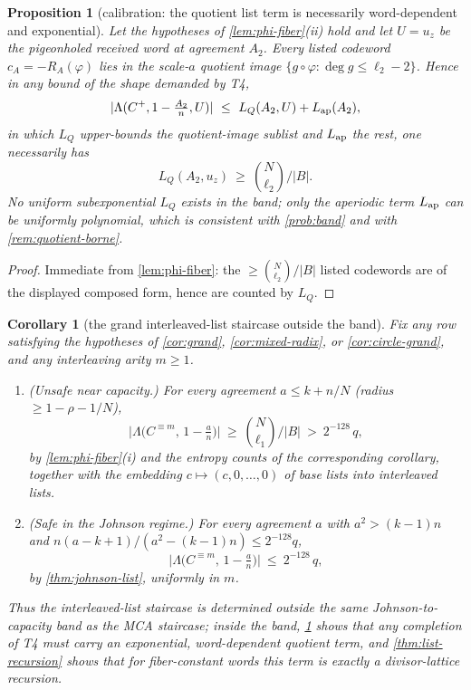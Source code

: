 \documentclass[11pt]{article}
\newtheorem{proposition}[theorem]{Proposition}
\newtheorem{corollary}[theorem]{Corollary}
\theoremstyle{definition}
\theoremstyle{remark}
\newcommand{\B}{B}
\newcommand{\Lst}{\Lambda}
\begin{document}
\begin{proposition}[calibration: the quotient list term is necessarily word-dependent and exponential]\label{prop:list-calibration}
Let the hypotheses of \cref{lem:phi-fiber}\textup{(ii)} hold and let $U=u_z$ be the pigeonholed received word at agreement $A_2$. Every listed codeword $c_A=-R_A(\varphi)$ lies in the scale-$a$ quotient image $\{g\circ\varphi:\deg g\le\ell_2-2\}$. Hence in any bound of the shape demanded by T4,
\[
|\Lst(C^+,1-\tfrac{A_2}n,U)|\ \le\ L_Q(A_2,U)+L_{\rm ap}(A_2),
\]
in which $L_Q$ upper-bounds the quotient-image sublist and $L_{\rm ap}$ the rest, one necessarily has
\[
L_Q(A_2,u_z)\ \ge\ \binom N{\ell_2}\Big/|\B| .
\]
No uniform subexponential $L_Q$ exists in the band; only the aperiodic term $L_{\rm ap}$ can be uniformly polynomial, which is consistent with \cref{prob:band} and with \cref{rem:quotient-borne}.
\end{proposition}

\begin{proof}
Immediate from \cref{lem:phi-fiber}: the $\ge\binom N{\ell_2}/|\B|$ listed codewords are of the displayed composed form, hence are counted by $L_Q$.
\end{proof}

\begin{corollary}[the grand interleaved-list staircase outside the band]\label{cor:list-sandwich}
Fix any row satisfying the hypotheses of \cref{cor:grand}, \cref{cor:mixed-radix}, or \cref{cor:circle-grand}, and any interleaving arity $m\ge1$.
\begin{enumerate}[label=\textup{(\roman*)}]
\item \textup{(Unsafe near capacity.)} For every agreement $a\le k+n/N$ \textup(radius $\ge1-\rho-1/N$\textup),
\[
\bigl|\Lst\bigl(C^{\equiv m},\,1-\tfrac an\bigr)\bigr|\ \ge\ \binom N{\ell_1}\Big/|\B|\ >\ 2^{-128}\,q ,
\]
by \cref{lem:phi-fiber}\textup{(i)} and the entropy counts of the corresponding corollary, together with the embedding $c\mapsto(c,0,\dots,0)$ of base lists into interleaved lists.
\item \textup{(Safe in the Johnson regime.)} For every agreement $a$ with $a^2>(k-1)n$ and $n(a-k+1)/(a^2-(k-1)n)\le2^{-128}q$,
\[
\bigl|\Lst\bigl(C^{\equiv m},\,1-\tfrac an\bigr)\bigr|\ \le\ 2^{-128}\,q ,
\]
by \cref{thm:johnson-list}, uniformly in $m$.
\end{enumerate}
Thus the interleaved-list staircase is determined outside the same Johnson-to-capacity band as the MCA staircase; inside the band, \cref{prop:list-calibration} shows that any completion of T4 must carry an exponential, word-dependent quotient term, and \cref{thm:list-recursion} shows that for fiber-constant words this term is exactly a divisor-lattice recursion.
\end{corollary}
\end{document}
